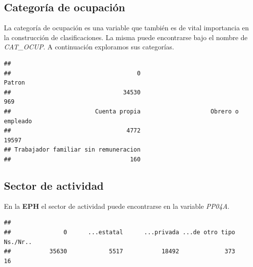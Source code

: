 \documentclass[
]{book}
\newenvironment{Shaded}{\begin{snugshade}}{\end{snugshade}}
\newcommand{\FunctionTok}[1]{\textcolor[rgb]{0.00,0.00,0.00}{#1}}
\newcommand{\NormalTok}[1]{#1}
\newcommand{\SpecialCharTok}[1]{\textcolor[rgb]{0.00,0.00,0.00}{#1}}
\begin{document}
\hypertarget{categoruxeda-de-ocupaciuxf3n-1}{%
\subsection{Categoría de ocupación}\label{categoruxeda-de-ocupaciuxf3n-1}}

La categoría de ocupación es una variable que también es de vital importancia en la construcción de clasificaciones. La misma puede encontrarse bajo el nombre de \emph{CAT\_OCUP}. A continuación exploramos sus categorías.

\begin{Shaded}
\end{Shaded}

\begin{verbatim}
## 
##                                    0                               Patron 
##                                34530                                  969 
##                        Cuenta propia                    Obrero o empleado 
##                                 4772                                19597 
## Trabajador familiar sin remuneracion 
##                                  160
\end{verbatim}

\hypertarget{sector-de-actividad-1}{%
\subsection{Sector de actividad}\label{sector-de-actividad-1}}

En la \textbf{EPH} el sector de actividad puede encontrarse en la variable \emph{PP04A}.

\begin{Shaded}
\end{Shaded}

\begin{verbatim}
## 
##               0      ...estatal      ...privada ...de otro tipo        Ns./Nr.. 
##           35630            5517           18492             373              16
\end{verbatim}
\end{document}
